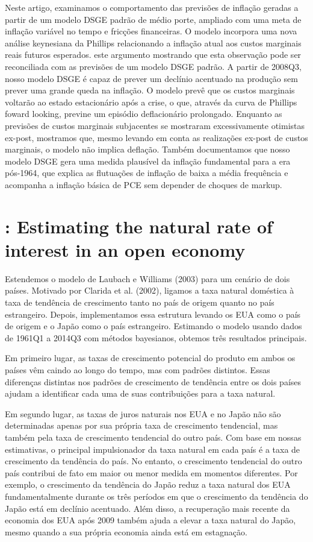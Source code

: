 \documentclass[11pt,oneside,a4paper]{article}
\begin{document}
Neste artigo, examinamos o comportamento das previsões de inflação geradas a partir de um modelo DSGE padrão de médio porte, ampliado com uma meta de inflação variável no tempo e fricções financeiras. O modelo incorpora uma nova análise keynesiana da Phillips relacionando a inflação atual aos custos marginais reais futuros esperados. este argumento mostrando que esta observação pode ser reconciliada com as previsões de um modelo DSGE padrão. A partir de 2008Q3, nosso modelo DSGE é capaz de prever um declínio acentuado na produção sem prever uma grande queda na inflação. O modelo prevê que os custos marginais voltarão ao estado estacionário após a crise, o que, através da curva de Phillips foward looking, previne um episódio deflacionário prolongado. Enquanto as previsões de custos marginais subjacentes se mostraram excessivamente otimistas ex-post, mostramos que, mesmo levando em conta as realizações ex-post de custos marginais, o modelo não implica deflação. Também documentamos que nosso modelo DSGE gera uma medida plausível da inflação fundamental para a era pós-1964, que explica as flutuações de inflação de baixa a média frequência e acompanha a inflação básica de PCE sem depender de choques de markup.
%
%
\section{\citet{Wynne:2018}: Estimating the natural rate of interest in an open economy }
Estendemos o modelo de Laubach e Williams (2003) para um cenário de dois países. Motivado por Clarida et al. (2002), ligamos a taxa natural doméstica à taxa de tendência de crescimento tanto no país de origem quanto no país estrangeiro. Depois, implementamos essa estrutura levando os EUA como o país de origem e o Japão como o país estrangeiro. Estimando o modelo usando dados de 1961Q1 a 2014Q3 com métodos bayesianos, obtemos três resultados principais.

Em primeiro lugar, as taxas de crescimento potencial do produto em ambos os países vêm caindo ao longo do tempo, mas com padrões distintos. Essas diferenças distintas nos padrões de crescimento de tendência entre os dois países ajudam a identificar cada uma de suas contribuições para a taxa natural.

Em segundo lugar, as taxas de juros naturais nos EUA e no Japão não são determinadas apenas por sua própria taxa de crescimento tendencial, mas também pela taxa de crescimento tendencial do outro país. Com base em nossas estimativas, o principal impulsionador da taxa natural em cada país é a taxa de crescimento da tendência do país. No entanto, o crescimento tendencial do outro país contribui de fato em maior ou menor medida em momentos diferentes. Por exemplo, o crescimento da tendência do Japão reduz a taxa natural dos EUA fundamentalmente durante os três períodos em que o crescimento da tendência do Japão está em declínio acentuado. Além disso, a recuperação mais recente da economia dos EUA após 2009 também ajuda a elevar a taxa natural do Japão, mesmo quando a sua própria economia ainda está em estagnação.
\end{document}
